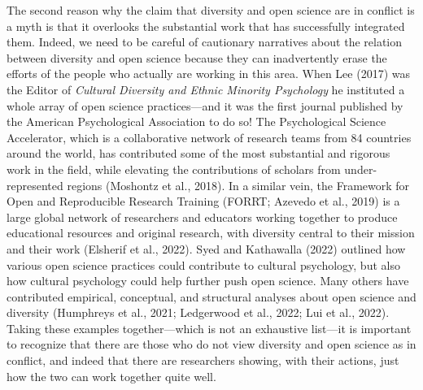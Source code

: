 \documentclass[authordate, empirical,issue]{jote-new-article}
\begin{document}
The second reason why the claim that diversity and open science are in conflict is a myth is that it overlooks the substantial work that has successfully integrated them. Indeed, we need to be careful of cautionary narratives about the relation between diversity and open science because they can inadvertently erase the efforts of the people who actually are working in this area. When Lee (2017) was the Editor of \emph{Cultural Diversity and Ethnic Minority Psychology} he instituted a whole array of open science practices—and it was the first journal published by the American Psychological Association to do so! The Psychological Science Accelerator, which is a collaborative network of research teams from 84 countries around the world, has contributed some of the most substantial and rigorous work in the field, while elevating the contributions of scholars from under-represented regions (Moshontz et al., 2018). In a similar vein, the Framework for Open and Reproducible Research Training (FORRT; Azevedo et al., 2019) is a large global network of researchers and educators working together to produce educational resources and original research, with diversity central to their mission and their work (Elsherif et al., 2022). Syed and Kathawalla (2022) outlined how various open science practices could contribute to cultural psychology, but also how cultural psychology could help further push open science. Many others have contributed empirical, conceptual, and structural analyses about open science and diversity (Humphreys et al., 2021; Ledgerwood et al., 2022; Lui et al., 2022). Taking these examples together—which is not an exhaustive list—it is important to recognize that there are those who do not view diversity and open science as in conflict, and indeed that there are researchers showing, with their actions, just how the two can work together quite well.
\end{document}
